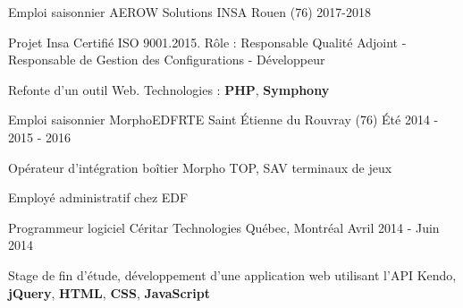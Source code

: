 

\begin{cventries}

  \cventry
	{Emploi saisonnier} %
	{AEROW Solutions} %
	{INSA Rouen (76)} %
	{2017-2018} %
	{
		\begin{cvitems} %
			\item {Projet Insa Certifié ISO 9001.2015. Rôle : Responsable Qualité Adjoint - Responsable de Gestion des Configurations - Développeur}
			\item {Refonte d'un outil Web. Technologies : \textbf{PHP}, \textbf{Symphony}}
		\end{cvitems}
	}
	
	
	\cventry
	{Emploi saisonnier} %
	{Morpho{\enskip\cdotp\enskip}EDF{\enskip\cdotp\enskip}RTE} %
	{Saint Étienne du Rouvray (76)} %
	{Été 2014 - 2015 - 2016} %
	{
		\begin{cvitems} %
			\item {Opérateur d'intégration boîtier Morpho TOP, SAV terminaux de jeux }
			\item {Employé administratif chez EDF}
		\end{cvitems}
	}


  \cventry
    {Programmeur logiciel} %
    {Céritar Technologies} %
    {Québec, Montréal} %
    {Avril 2014 - Juin 2014} %
    {
      \begin{cvitems} %
        \item {Stage de fin d'étude, développement d'une application web utilisant l'API Kendo, \textbf{jQuery}, \textbf{HTML}, \textbf{CSS}, \textbf{JavaScript}}
      \end{cvitems}
    }

\end{cventries}
